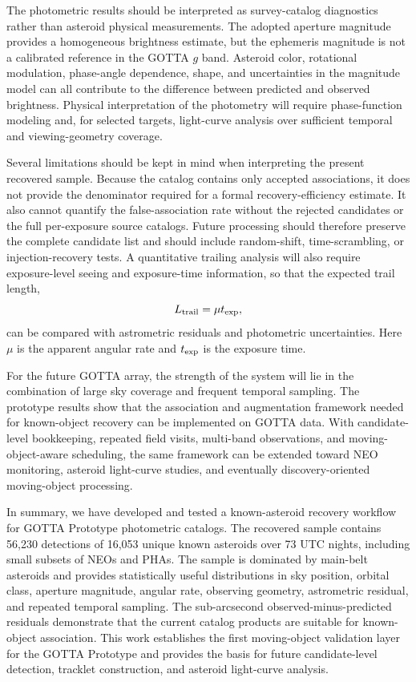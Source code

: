 \documentclass[referee]{raa}
\begin{document}
The photometric results should be interpreted as survey-catalog diagnostics rather than asteroid physical measurements. The adopted aperture magnitude provides a homogeneous brightness estimate, but the ephemeris magnitude is not a calibrated reference in the GOTTA $g$ band. Asteroid color, rotational modulation, phase-angle dependence, shape, and uncertainties in the magnitude model can all contribute to the difference between predicted and observed brightness. Physical interpretation of the photometry will require phase-function modeling and, for selected targets, light-curve analysis over sufficient temporal and viewing-geometry coverage.

Several limitations should be kept in mind when interpreting the present recovered sample. Because the catalog contains only accepted associations, it does not provide the denominator required for a formal recovery-efficiency estimate. It also cannot quantify the false-association rate without the rejected candidates or the full per-exposure source catalogs. Future processing should therefore preserve the complete candidate list and should include random-shift, time-scrambling, or injection-recovery tests. A quantitative trailing analysis will also require exposure-level seeing and exposure-time information, so that the expected trail length,
\begin{equation}
L_{\rm trail}=\mu t_{\rm exp},
\end{equation}
can be compared with astrometric residuals and photometric uncertainties. Here $\mu$ is the apparent angular rate and $t_{\rm exp}$ is the exposure time.

For the future GOTTA array, the strength of the system will lie in the combination of large sky coverage and frequent temporal sampling. The prototype results show that the association and augmentation framework needed for known-object recovery can be implemented on GOTTA data. With candidate-level bookkeeping, repeated field visits, multi-band observations, and moving-object-aware scheduling, the same framework can be extended toward NEO monitoring, asteroid light-curve studies, and eventually discovery-oriented moving-object processing.

In summary, we have developed and tested a known-asteroid recovery workflow for GOTTA Prototype photometric catalogs. The recovered sample contains 56,230 detections of 16,053 unique known asteroids over 73 UTC nights, including small subsets of NEOs and PHAs. The sample is dominated by main-belt asteroids and provides statistically useful distributions in sky position, orbital class, aperture magnitude, angular rate, observing geometry, astrometric residual, and repeated temporal sampling. The sub-arcsecond observed-minus-predicted residuals demonstrate that the current catalog products are suitable for known-object association. This work establishes the first moving-object validation layer for the GOTTA Prototype and provides the basis for future candidate-level detection, tracklet construction, and asteroid light-curve analysis.
\end{document}
